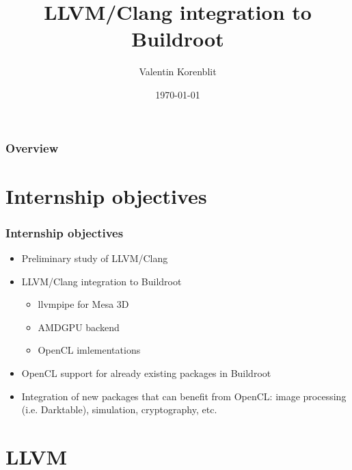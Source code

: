 \documentclass{beamer}
\title[]{LLVM/Clang integration to Buildroot}
\author{Valentin Korenblit}
\institute[Smile]
{
Smile \\~\\
\medskip
\textit{valentin.korenblit@smile.fr}
}
\date{\today}
\begin{document}
\begin{frame}
\titlepage
\end{frame}

\begin{frame}
\frametitle{Overview}
\tableofcontents
\end{frame}

\section{Internship objectives}

\begin{frame}
\frametitle{Internship objectives}
\begin{itemize}
  \item Preliminary study of LLVM/Clang
  \item LLVM/Clang integration to Buildroot
  \begin{itemize}
    \item llvmpipe for Mesa 3D
    \item AMDGPU backend
    \item OpenCL imlementations
  \end{itemize}
  \item OpenCL support for already existing packages in Buildroot
  \item Integration of new packages that can benefit from OpenCL:
  image processing (i.e. Darktable), simulation, cryptography, etc.
\end{itemize}
\end{frame}
\section{LLVM}
\end{document}
